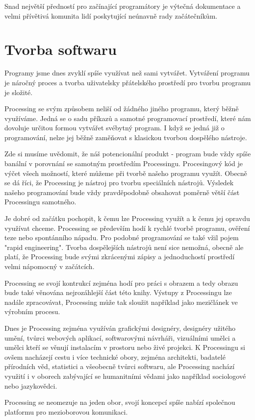 \documentclass[10pt]{book}
\newcommand{\oddil}[1]{\section{#1}\index{#1}\label{#1}}
\begin{document}
Snad největší předností pro začínající programátory je výtečná dokumentace a velmi přívětivá komunita lidí poskytující neúnavně rady začátečníkům.


\oddil{Tvorba softwaru}

Programy jsme dnes zvyklí spíše využívat než sami vytvářet. Vytváření programu je náročný proces a tvorba uživatelsky přátelského prostředí pro tvorbu programu je složité.

Processing se svým způsobem neliší od žádného jiného programu, který běžně využíváme. Jedná se o sadu příkazů a samotné programovací prostředí, které nám dovoluje určitou formou vytvářet svébytný program. I když se jedná již o programování, nelze jej běžně zaměňovat s klasickou tvorbou dospělého nástroje.

Zde si musíme uvědomit, že náš potencionální produkt - program bude vždy spíše banální v porovnání se samotným prostředím Processingu. Procesingový kód je výčet všech možností, které můžeme při tvorbě našeho programu využít. Obecně se dá říci, že Processing je nástroj pro tvorbu speciálních nástrojů. Výsledek našeho programování bude vždy pravděpodobně obsahovat poměrně větší část Processingu samotného.

Je dobré od začátku pochopit, k čemu lze Processing využít a k čemu jej opravdu využívat chceme. Processing se především hodí k rychlé tvorbě programu, ověření teze nebo spontánního nápadu. Pro podobné programování se také vžil pojem "rapid engineering". Tvorba dospělejších nástrojů není sice nemožná, obecně ale platí, že Processing bude svými zkrácenými zápisy a jednoduchostí prostředí velmi nápomocný v začátcích. 

Processing se svojí kontrukcí zejména hodí pro práci s obrazem a tedy obrazu bude také věnována nejrozáhlejší část této knihy. Výstupy z Processingu lze nadále zpracovávat, Processing může tak sloužit například jako mezičlánek ve výrobním procesu.

Dnes je Processing zejména využíván grafickými designéry, designéry užitého umění, tvůrci webových aplikací, softwarovými návrháři, vizuálními umělci a umělci kteří se věnují instalacím v prostoru nebo živé projekci. K Processingu si ovšem nacházejí cestu i více technické obory, zejména architekti, badatelé přírodních věd, statistici a všeobecně tvůrci softwaru, ale Processing nachází využití i v oborech zabývající se humanitními vědami jako například sociologové nebo jazykovědci.

Processing se neomezuje na jeden obor, svojí koncepcí spíše nabízí společnou platformu pro mezioborovou komunikaci.
\end{document}
